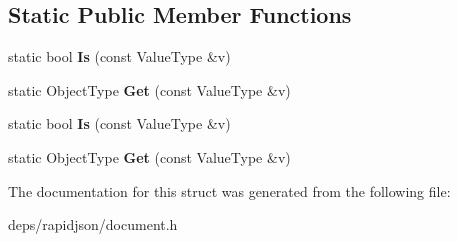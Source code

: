 \subsection*{Static Public Member Functions}
\begin{DoxyCompactItemize}
\item 
static bool {\bfseries Is} (const Value\+Type \&v)\hypertarget{structinternal_1_1_type_helper_3_01_value_type_00_01typename_01_value_type_1_1_const_object_01_4_a843e707732c55f2178d399a0af13605a}{}\label{structinternal_1_1_type_helper_3_01_value_type_00_01typename_01_value_type_1_1_const_object_01_4_a843e707732c55f2178d399a0af13605a}

\item 
static Object\+Type {\bfseries Get} (const Value\+Type \&v)\hypertarget{structinternal_1_1_type_helper_3_01_value_type_00_01typename_01_value_type_1_1_const_object_01_4_ae6a797157c9b3d15ca4a32c48ea4bc73}{}\label{structinternal_1_1_type_helper_3_01_value_type_00_01typename_01_value_type_1_1_const_object_01_4_ae6a797157c9b3d15ca4a32c48ea4bc73}

\item 
static bool {\bfseries Is} (const Value\+Type \&v)\hypertarget{structinternal_1_1_type_helper_3_01_value_type_00_01typename_01_value_type_1_1_const_object_01_4_a843e707732c55f2178d399a0af13605a}{}\label{structinternal_1_1_type_helper_3_01_value_type_00_01typename_01_value_type_1_1_const_object_01_4_a843e707732c55f2178d399a0af13605a}

\item 
static Object\+Type {\bfseries Get} (const Value\+Type \&v)\hypertarget{structinternal_1_1_type_helper_3_01_value_type_00_01typename_01_value_type_1_1_const_object_01_4_ae6a797157c9b3d15ca4a32c48ea4bc73}{}\label{structinternal_1_1_type_helper_3_01_value_type_00_01typename_01_value_type_1_1_const_object_01_4_ae6a797157c9b3d15ca4a32c48ea4bc73}

\end{DoxyCompactItemize}


The documentation for this struct was generated from the following file\+:\begin{DoxyCompactItemize}
\item 
deps/rapidjson/document.\+h\end{DoxyCompactItemize}
